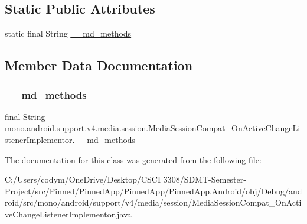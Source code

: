 \subsection*{Static Public Attributes}
\begin{DoxyCompactItemize}
\item 
static final String \hyperlink{classmono_1_1android_1_1support_1_1v4_1_1media_1_1session_1_1_media_session_compat___on_active_change_listener_implementor_a7d352c858f06680808244b09f3ed2849}{\+\_\+\+\_\+md\+\_\+methods}
\end{DoxyCompactItemize}


\subsection{Member Data Documentation}
\mbox{\label{classmono_1_1android_1_1support_1_1v4_1_1media_1_1session_1_1_media_session_compat___on_active_change_listener_implementor_a7d352c858f06680808244b09f3ed2849}} 
\subsubsection{\texorpdfstring{\+\_\+\+\_\+md\+\_\+methods}{\_\_md\_methods}}
{\footnotesize\ttfamily final String mono.\+android.\+support.\+v4.\+media.\+session.\+Media\+Session\+Compat\+\_\+\+On\+Active\+Change\+Listener\+Implementor.\+\_\+\+\_\+md\+\_\+methods\hspace{0.3cm}{\ttfamily [static]}}



The documentation for this class was generated from the following file\+:\begin{DoxyCompactItemize}
\item 
C\+:/\+Users/codym/\+One\+Drive/\+Desktop/\+C\+S\+C\+I 3308/\+S\+D\+M\+T-\/\+Semester-\/\+Project/src/\+Pinned/\+Pinned\+App/\+Pinned\+App/\+Pinned\+App.\+Android/obj/\+Debug/android/src/mono/android/support/v4/media/session/Media\+Session\+Compat\+\_\+\+On\+Active\+Change\+Listener\+Implementor.\+java\end{DoxyCompactItemize}
